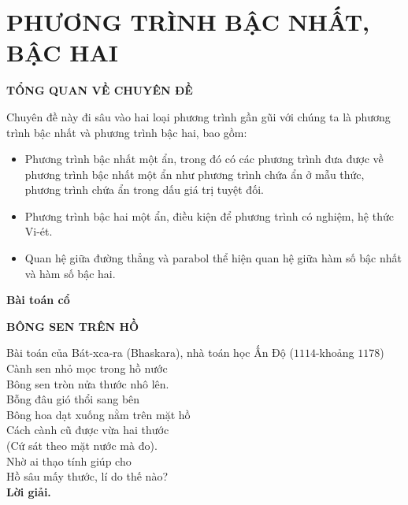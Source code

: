 \section{PHƯƠNG TRÌNH BẬC NHẤT, BẬC HAI}

\begin{center}
 \large \textbf{TỔNG QUAN VỀ CHUYÊN ĐỀ}
\end{center}
Chuyên đề này đi sâu vào hai loại phương trình gần gũi với chúng ta là phương trình bậc nhất và phương trình bậc hai, bao gồm:
\begin{itemize}
\item Phương trình bậc nhất một ẩn, trong đó có các phương trình đưa được về phương trình bậc nhất một ẩn như phương trình chứa ẩn ở mẫu thức, phương trình chứa ẩn trong dấu giá trị tuyệt đối.
\item Phương trình bậc hai một ẩn, điều kiện để phương trình có nghiệm, hệ thức Vi-ét.
\item Quan hệ giữa đường thẳng và parabol thể hiện quan hệ giữa hàm số bậc nhất và hàm số bậc hai.
\end{itemize}
\textbf{Bài toán cổ}
\begin{center}
 \large \textbf{BÔNG SEN TRÊN HỒ}
\end{center}
Bài toán của Bát-xca-ra (Bhaskara), nhà toán học Ấn Độ ($1114$-khoảng $1178$)\\
Cành sen nhỏ mọc trong hồ nước\\
Bông sen tròn nửa thước nhô lên.\\
Bỗng đâu gió thổi sang bên\\
Bông hoa dạt xuống nằm trên mặt hồ\\
Cách cành cũ được vừa hai thước\\
(Cứ sát theo mặt nước mà đo).\\
Nhờ ai thạo tính giúp cho\\
Hồ sâu mấy thước, lí do thế nào?\\
\textbf{Lời giải.}
{
}



